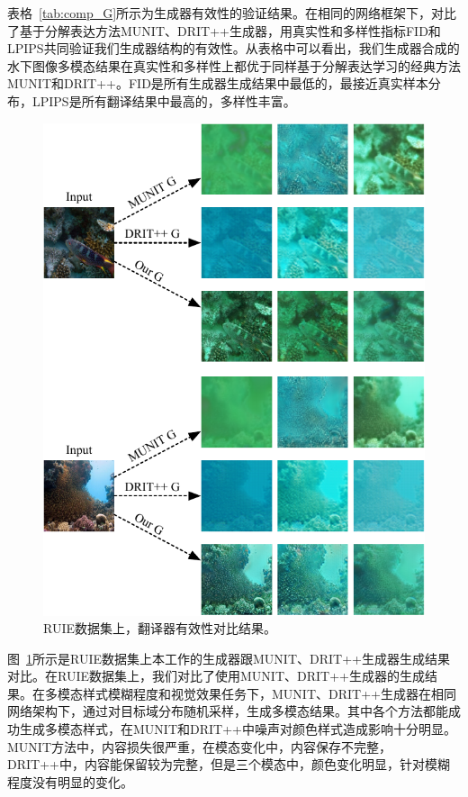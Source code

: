 表格~\ref{tab:comp_G}所示为生成器有效性的验证结果。在相同的网络框架下，对比了基于分解表达方法MUNIT、DRIT++生成器，用真实性和多样性指标FID和LPIPS共同验证我们生成器结构的有效性。从表格中可以看出，我们生成器合成的水下图像多模态结果在真实性和多样性上都优于同样基于分解表达学习的经典方法MUNIT和DRIT++。FID是所有生成器生成结果中最低的，最接近真实样本分布，LPIPS是所有翻译结果中最高的，多样性丰富。

\begin{figure}
    \centering
  \includegraphics[width=\textwidth]{figures/Ablation_modal_ruie.pdf}
  \caption{RUIE数据集上，翻译器有效性对比结果。}
  \label{fig:ablation_modal_ruie}
\end{figure}

图~\ref{fig:ablation_modal_ruie}所示是RUIE数据集上本工作的生成器跟MUNIT、DRIT++生成器生成结果对比。在RUIE数据集上，我们对比了使用MUNIT、DRIT++生成器的生成结果。在多模态样式模糊程度和视觉效果任务下，MUNIT、DRIT++生成器在相同网络架构下，通过对目标域分布随机采样，生成多模态结果。其中各个方法都能成功生成多模态样式，在MUNIT和DRIT++中噪声对颜色样式造成影响十分明显。MUNIT方法中，内容损失很严重，在模态变化中，内容保存不完整，DRIT++中，内容能保留较为完整，但是三个模态中，颜色变化明显，针对模糊程度没有明显的变化。

